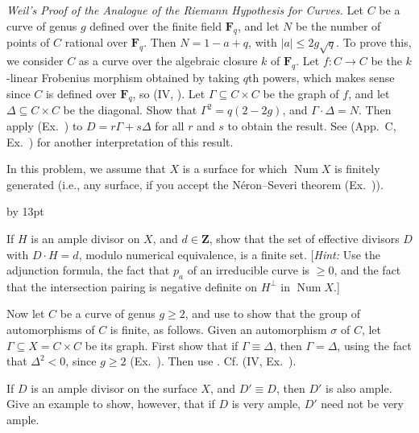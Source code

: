 {{\smallskip
\noindent\hypertarget{ex-V-1.10}{}\emph{Weil's Proof  of the Analogue of the Riemann Hypothesis for Curves.} Let $C$ be a curve of genus $g$ defined over the finite field $\mathbf F_q$, and let $N$ be the number of points of $C$ rational over $\mathbf F_q$. Then $N=1-a+q$, with $|a|\leq2g\sqrt q$. To prove this, we consider $C$ as a curve over the algebraic closure $k$ of $\mathbf F_q$. Let $f\colon C\to C$ be the $k$-linear Frobenius morphism obtained by taking $q$th powers, which makes sense since $C$ is defined over $\mathbf F_q$, so  (IV, ). Let $\Gamma\subseteq C\times C$ be the graph of $f$, and let $\Delta\subseteq C\times C$ be the diagonal. Show that $\Gamma^2=q(2-2g)$, and $\Gamma\cdot\Delta=N$. Then apply (Ex.~) to $D=r\Gamma+s\Delta$ for all $r$ and $s$ to obtain the result. See (App.~C, Ex.~) for another interpretation of this result.

\smallskip
\noindent\hypertarget{ex-V-1.11}{}In this problem, we assume that $X$ is a surface for which $\operatorname{Num}X$ is finitely generated (i.e., any surface, if you accept the N\'eron--Severi theorem (Ex.~)).
{\advance\leftskip by 13pt\par
\noindent\hypertarget{ex-V-1.11a}{}If $H$ is an ample divisor on $X$, and $d\in\mathbf Z$, show that the set of effective divisors $D$ with $D\cdot H=d$, modulo numerical equivalence, is a finite set. [\emph{Hint:} Use the adjunction formula, the fact that $p_a$ of an irreducible curve is $\geq0$, and the fact that the intersection pairing is negative definite on $H^\perp$ in $\operatorname{Num}X$.]

\noindent\hypertarget{ex-V-1.11b}{}Now let $C$ be a curve of genus $g\geq2$, and use  to show that the group of automorphisms of $C$ is finite, as follows. Given an automorphism $\sigma$ of $C$, let $\Gamma\subseteq X=C\times C$ be its graph. First show that if $\Gamma\equiv\Delta$, then $\Gamma=\Delta$, using the fact that $\Delta^2<0$, since $g\geq2$ (Ex.~). Then use . Cf. (IV, Ex.~).\par}

\smallskip
\noindent\hypertarget{ex-V-1.12}{}If $D$ is an ample divisor on the surface $X$, and $D'\equiv D$, then $D'$ is also ample. Give an example to show, however, that if $D$ is very ample, $D'$ need not be very ample.\par}
}
